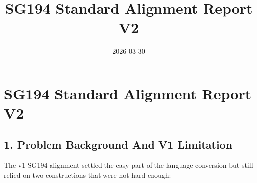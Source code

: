 \documentclass[11pt]{article}
\begin{document}
        \title{SG194 Standard Alignment Report V2}
        \date{2026-03-30}
        \maketitle
        \section*{SG194 Standard Alignment Report V2}

\subsection*{1. Problem Background And V1 Limitation}

        The v1 SG194 alignment settled the easy part of the language conversion but still relied on two constructions that were not hard enough:
\end{document}
